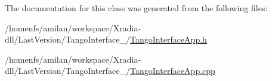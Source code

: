 The documentation for this class was generated from the following files:\begin{CompactItemize}
\item 
/homenfs/amilan/workspace/Xradia-dll/LastVersion/TangoInterface\_/\hyperlink{TangoInterfaceApp_8h}{TangoInterfaceApp.h}\item 
/homenfs/amilan/workspace/Xradia-dll/LastVersion/TangoInterface\_/\hyperlink{TangoInterfaceApp_8cpp}{TangoInterfaceApp.cpp}\end{CompactItemize}
